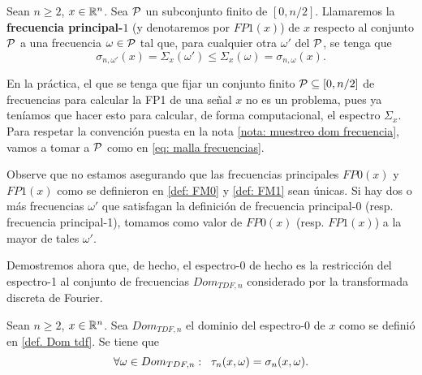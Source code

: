 \begin{defi}
	\label{def: FM1}
	Sean $n \geq 2$, $x \in \mathbb{R}^{n}$. Sea
	$\mathcal{P}$ un subconjunto finito
	de $[0, n/2]$.
	Llamaremos la \textbf{frecuencia principal-$1$}
	(y denotaremos
	por $FP1(x)$) 
	de $x$ respecto al conjunto $\mathcal{P}$	
	a una frecuencia $\omega \in \mathcal{P}$ 
	tal que, para cualquier otra $\omega'$ del $\mathcal{P}$, se tenga que
	\[
	\sigma_{n, \omega'}(x) = \Sigma_{x}(\omega') 
	\leq \Sigma_{x}(\omega) = \sigma_{n, \omega}(x).
	\]
\end{defi}
En la práctica, el que se tenga que fijar un conjunto
finito $\mathcal{P} \subseteq [0, n/2]$ de frecuencias
para calcular la FP1 de una
señal $x$ no es un problema, pues ya teníamos que hacer
esto para calcular, de forma computacional, el espectro
$\Sigma_{x}$. Para respetar la convención
puesta en la nota 
\ref{nota: muestreo dom frecuencia}, vamos
a tomar a $\mathcal{P}$ como en 
\eqref{eq: malla frecuencias}.
	
\begin{nota}
Observe que no estamos asegurando
que las frecuencias principales
$FP0(x)$ y $FP1(x)$ como se definieron en 
\ref{def: FM0} y \ref{def: FM1}
sean únicas.
Si hay dos o más frecuencias $\omega'$ que satisfagan
la definición de frecuencia principal-0 
(resp. frecuencia principal-1), tomamos
como valor de $FP0(x)$ 
(resp. $FP1(x)$)
a la mayor de tales $\omega'$.
\end{nota}


Demostremos ahora que, de hecho, el espectro-0
de hecho es la restricción del espectro-1
al conjunto de frecuencias 
$Dom_{TDF, n}$ considerado por la transformada discreta
de Fourier.
\begin{prop}
\label{prop: coinciden espectr}
Sean $n \geq 2$, $x \in \mathbb{R}^{n}$.
Sea $Dom_{TDF, n}$ el dominio del espectro-0 de $x$
como se definió en \ref{def. Dom tdf}. Se tiene que
\begin{equation}
\label{eq4: 4May}
\forall \omega \in Dom_{TDF, n}:
\hspace{0.2cm} \tau_{n}(x, \omega) = \sigma_{n}(x, \omega).
\end{equation}
\end{prop}

